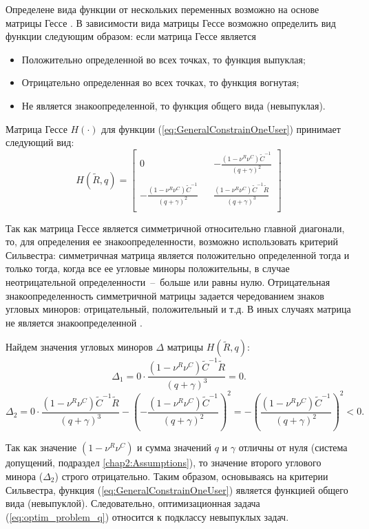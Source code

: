 Определене вида функции от нескольких переменных возможно на основе матрицы Гессе \cite{convex_opt}. В зависимости вида матрицы Гессе возможно определить вид функции следующим образом: если матрица Гессе является
\begin{itemize}
	\item Положительно определенной во всех точках, то функция выпуклая;
	\item Отрицательно определенная во всех точках, то функция вогнутая;
	\item Не является знакоопределенной, то функция общего вида (невыпуклая).
\end{itemize}

Матрица Гессе $H(\cdot)$ для функции (\ref{eq:GeneralConstrainOneUser}) принимает следующий вид:
$$H(\tilde{R}, q)=
  \left[ {\begin{array}{ccc}
   0 & &-\frac{\left(1-\nu^R\nu^C\right)\tilde{C}^{-1}}{(q + \gamma)^2} \\
   & & \\
   -\frac{\left(1-\nu^R\nu^C\right)\tilde{C}^{-1}}{(q + \gamma)^2} & & \frac{\left(1-\nu^R\nu^C\right)\tilde{C}^{-1} \tilde{R}}{(q + \gamma)^3} \\
  \end{array} } \right]
$$

Так как матрица Гессе является симметричной относительно главной диагонали, то, для определения ее знакоопределенности, возможно использовать критерий Сильвестра: симметричная матрица является положительно определенной тогда и только тогда, когда все ее угловые миноры положительны, в случае неотрицательной определенности~--~больше или равны нулю. Отрицательная знакоопределенность симметричной матрицы задается чередованием знаков угловых миноров: отрицательный, положительный и т.д. В иных случаях матрица не является знакоопределенной \cite{convex_opt}.

Найдем значения угловых миноров $\Delta$ матрицы $H(\tilde{R}, q)$:
$$\Delta_1 = 0 \cdot \frac{\left(1-\nu^R\nu^C\right)\tilde{C}^{-1} \tilde{R}}{(q + \gamma)^3} = 0.$$
$$\Delta_2 = 0 \cdot \frac{\left(1-\nu^R\nu^C\right)\tilde{C}^{-1} \tilde{R}}{(q + \gamma)^3} - \left(-\frac{\left(1-\nu^R\nu^C\right)\tilde{C}^{-1}}{(q + \gamma)^2}\right)^2 = - \left(\frac{\left(1-\nu^R\nu^C\right)\tilde{C}^{-1}}{(q + \gamma)^2}\right)^2 < 0.$$

Так как значение $\left(1-\nu^R\nu^C\right)$ и сумма значений $q$ и $\gamma$ отличны от нуля (система допущений, подраздел \ref{chap2:Assumptions}), то значение второго углового минора ($\Delta_2$) строго отрицательно. Таким образом, основываясь на критерии Сильвестра, функция (\ref{eq:GeneralConstrainOneUser}) является функцией общего вида (невыпуклой). Следовательно, оптимизационная задача (\ref{eq:optim_problem_q}) относится к подклассу невыпуклых задач.

